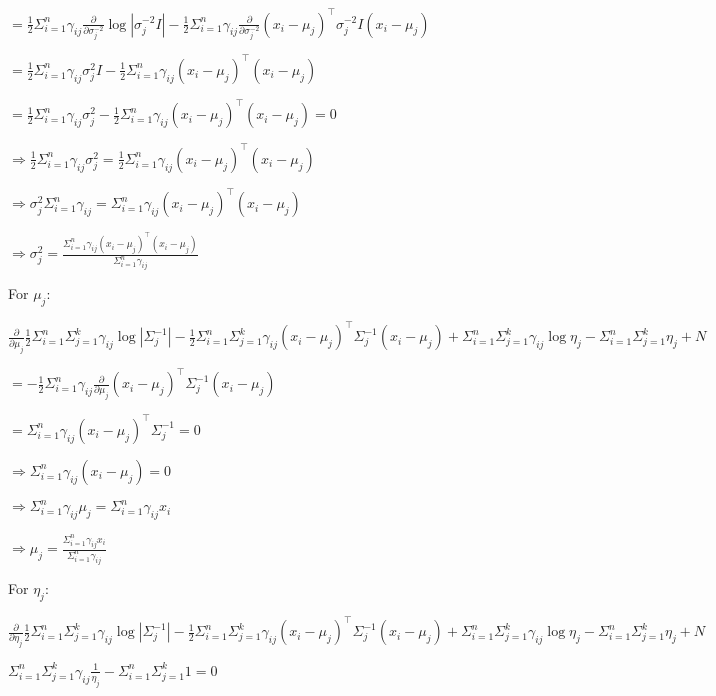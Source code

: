 \documentclass[
]{article}
\begin{document}
\(= \frac{1}{2}\Sigma_{i=1}^n \gamma_{ij} \frac{\partial}{\partial \sigma^{-2}_j}\log |\sigma^{-2}_jI|-\frac{1}{2}\Sigma_{i=1}^n \gamma_{ij}\frac{\partial}{\partial \sigma^{-2}_j}(x_i-\mu_j)^\top\sigma^{-2}_jI(x_i-\mu_j)\)

\(= \frac{1}{2}\Sigma_{i=1}^n \gamma_{ij} \sigma^{2}_jI-\frac{1}{2}\Sigma_{i=1}^n \gamma_{ij}(x_i-\mu_j)^\top(x_i-\mu_j)\)

\(= \frac{1}{2}\Sigma_{i=1}^n \gamma_{ij} \sigma^{2}_j-\frac{1}{2}\Sigma_{i=1}^n \gamma_{ij}(x_i-\mu_j)^\top(x_i-\mu_j) = 0\)

\(\Rightarrow \frac{1}{2}\Sigma_{i=1}^n \gamma_{ij} \sigma^{2}_j = \frac{1}{2}\Sigma_{i=1}^n \gamma_{ij}(x_i-\mu_j)^\top(x_i-\mu_j)\)

\(\Rightarrow \sigma^{2}_j \Sigma_{i=1}^n \gamma_{ij} = \Sigma_{i=1}^n \gamma_{ij}(x_i-\mu_j)^\top(x_i-\mu_j)\)

\(\Rightarrow \sigma^{2}_j = \frac{\Sigma_{i=1}^n \gamma_{ij}(x_i-\mu_j)^\top(x_i-\mu_j)}{\Sigma_{i=1}^n \gamma_{ij}}\)

For \(\mu_j:\)

\(\frac{\partial}{\partial \mu_j}\frac{1}{2}\Sigma_{i=1}^n \Sigma_{j=1}^k \gamma_{ij} \log |\Sigma_j^{-1}|-\frac{1}{2}\Sigma_{i=1}^n \Sigma_{j=1}^k \gamma_{ij}(x_i-\mu_j)^\top \Sigma_j^{-1}(x_i-\mu_j) + \Sigma_{i=1}^n \Sigma_{j=1}^k \gamma_{ij} \log \eta_j - \Sigma_{i=1}^n \Sigma_{j=1}^k \eta_j + N\)

\(= -\frac{1}{2}\Sigma_{i=1}^n \gamma_{ij}\frac{\partial}{\partial \mu_j}(x_i-\mu_j)^\top \Sigma_j^{-1}(x_i-\mu_j)\)

\(= \Sigma_{i=1}^n\gamma_{ij}(x_i-\mu_j)^\top \Sigma_j^{-1} = 0\)

\(\Rightarrow \Sigma_{i=1}^n \gamma_{ij}(x_i-\mu_j) = 0\)

\(\Rightarrow \Sigma_{i=1}^n \gamma_{ij}\mu_j = \Sigma_{i=1}^n \gamma_{ij}x_i\)

\(\Rightarrow \mu_j = \frac{\Sigma_{i=1}^n \gamma_{ij}x_i}{\Sigma_{i=1}^n \gamma_{ij}}\)

For \(\eta_j:\)

\(\frac{\partial}{\partial \eta_j}\frac{1}{2}\Sigma_{i=1}^n \Sigma_{j=1}^k \gamma_{ij} \log |\Sigma_j^{-1}|-\frac{1}{2}\Sigma_{i=1}^n \Sigma_{j=1}^k \gamma_{ij}(x_i-\mu_j)^\top \Sigma_j^{-1}(x_i-\mu_j) + \Sigma_{i=1}^n \Sigma_{j=1}^k \gamma_{ij} \log \eta_j - \Sigma_{i=1}^n \Sigma_{j=1}^k \eta_j + N\)

\(\Sigma_{i=1}^n \Sigma_{j=1}^k \gamma_{ij} \frac{1}{\eta_j} - \Sigma_{i=1}^n \Sigma_{j=1}^k 1 = 0\)
\end{document}
